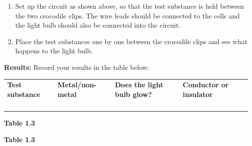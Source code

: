        \newline
      \label{m38706*id66260}\begin{enumerate}[noitemsep, label=\textbf{\arabic*}. ] 
            \label{m38706*uid100}\item Set up the circuit as shown above, so that the test substance is held between the two crocodile clips. The wire leads should be connected to the cells and the light bulb should also be connected into the circuit.
\label{m38706*uid101}\item Place the test substances one by one between the crocodile clips and see what happens to the light bulb.
\end{enumerate}
        \par 
      \label{m38706*id66291}\noindent{}\textbf{Results:}
        \newline
      Record your results in the table below:
          \begin{table}[H]
        \begin{center}
      \label{m38706*id66304}
    \noindent
      \tablelasttail{}
      \begin{xtabular}[t]{|l|l|l|l|}\hline
                \textbf{Test substance}
               &
                \textbf{Metal/non-metal}
               &
                \textbf{Does the light bulb glow?}
               &
                \textbf{Conductor or insulator}
     \tabularnewline{}
         &
         &
         &
     \tabularnewline{}
         &
         &
         &
     \tabularnewline{}
         &
         &
         &
     \tabularnewline{}
         &
         &
         &
     \tabularnewline{}
    \end{xtabular}
      \end{center}
    \begin{center}{\small\bfseries Table 1.3}\end{center}
    \begin{caption}{\small\bfseries Table 1.3}\end{caption}
\end{table}
